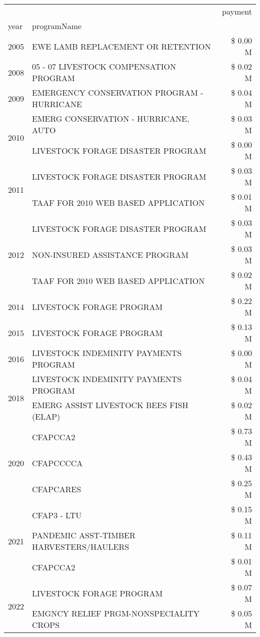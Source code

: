 \begin{tabular}{llr}
\toprule
 &  & payment \\
year & programName &  \\
\midrule
2005 & EWE LAMB REPLACEMENT OR RETENTION & \$ 0.00 M \\
\cline{1-3}
2008 & 05 - 07 LIVESTOCK COMPENSATION PROGRAM & \$ 0.02 M \\
\cline{1-3}
2009 & EMERGENCY CONSERVATION PROGRAM - HURRICANE & \$ 0.04 M \\
\cline{1-3}
\multirow[t]{2}{*}{2010} & EMERG CONSERVATION - HURRICANE, AUTO & \$ 0.03 M \\
 & LIVESTOCK FORAGE DISASTER PROGRAM & \$ 0.00 M \\
\cline{1-3}
\multirow[t]{2}{*}{2011} & LIVESTOCK FORAGE DISASTER PROGRAM & \$ 0.03 M \\
 & TAAF FOR 2010 WEB BASED APPLICATION & \$ 0.01 M \\
\cline{1-3}
\multirow[t]{3}{*}{2012} & LIVESTOCK FORAGE DISASTER PROGRAM & \$ 0.03 M \\
 & NON-INSURED ASSISTANCE PROGRAM & \$ 0.03 M \\
 & TAAF FOR 2010 WEB BASED APPLICATION & \$ 0.02 M \\
\cline{1-3}
2014 & LIVESTOCK FORAGE PROGRAM & \$ 0.22 M \\
\cline{1-3}
2015 & LIVESTOCK FORAGE PROGRAM & \$ 0.13 M \\
\cline{1-3}
2016 & LIVESTOCK INDEMINITY PAYMENTS PROGRAM & \$ 0.00 M \\
\cline{1-3}
\multirow[t]{2}{*}{2018} & LIVESTOCK INDEMINITY PAYMENTS PROGRAM & \$ 0.04 M \\
 & EMERG ASSIST LIVESTOCK BEES FISH (ELAP) & \$ 0.02 M \\
\cline{1-3}
\multirow[t]{3}{*}{2020} & CFAPCCA2 & \$ 0.73 M \\
 & CFAPCCCCA & \$ 0.43 M \\
 & CFAPCARES & \$ 0.25 M \\
\cline{1-3}
\multirow[t]{3}{*}{2021} & CFAP3 - LTU & \$ 0.15 M \\
 & PANDEMIC ASST-TIMBER HARVESTERS/HAULERS & \$ 0.11 M \\
 & CFAPCCA2 & \$ 0.01 M \\
\cline{1-3}
\multirow[t]{2}{*}{2022} & LIVESTOCK FORAGE PROGRAM & \$ 0.07 M \\
 & EMGNCY RELIEF PRGM-NONSPECIALITY CROPS & \$ 0.05 M \\
\cline{1-3}
\bottomrule
\end{tabular}
